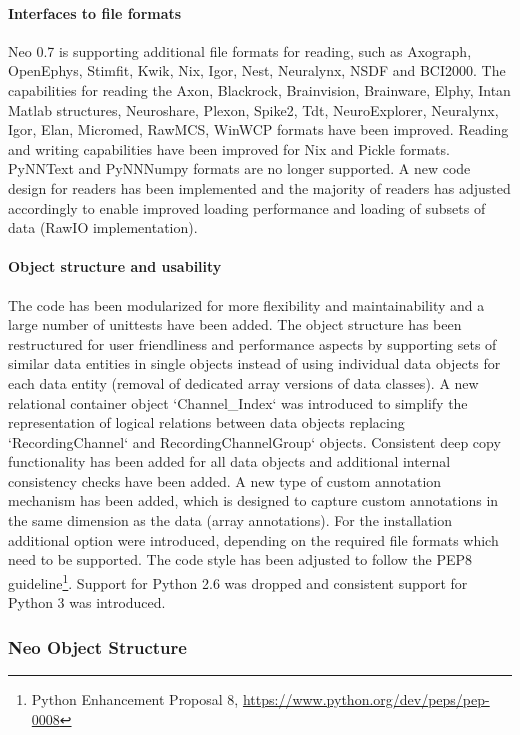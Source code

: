 \paragraph{Interfaces to file formats}
Neo 0.7 is supporting additional file formats for reading, such as Axograph, OpenEphys, Stimfit, Kwik, Nix, Igor, Nest, Neuralynx, NSDF and BCI2000. The capabilities for reading the Axon, Blackrock, Brainvision, Brainware, Elphy, Intan Matlab structures, Neuroshare, Plexon, Spike2, Tdt, NeuroExplorer, Neuralynx, Igor, Elan, Micromed, RawMCS, WinWCP formats have been improved. Reading and writing capabilities have been improved for Nix and Pickle formats. PyNNText and PyNNNumpy formats are no longer supported. A new code design for readers has been implemented and the majority of readers has adjusted accordingly to enable improved loading performance and loading of subsets of data (RawIO implementation). 
\paragraph{Object structure and usability}
The code has been modularized for more flexibility and maintainability and a large number of unittests have been added. The object structure has been restructured for user friendliness and performance aspects by supporting sets of similar data entities in single objects instead of using individual data objects for each data entity (removal of dedicated array versions of data classes). A new relational container object `Channel\_Index` was introduced to simplify the representation of logical relations between data objects replacing `RecordingChannel` and RecordingChannelGroup` objects. Consistent deep copy functionality has been added for all data objects and additional internal consistency checks have been added. A new type of custom annotation mechanism has been added, which is designed to capture custom annotations in the same dimension as the data (array annotations). For the installation additional option were introduced, depending on the required file formats which need to be supported. The code style has been adjusted to follow the PEP8 guideline\footnote{Python Enhancement Proposal 8, \url{https://www.python.org/dev/peps/pep-0008}}. Support for Python 2.6 was dropped and consistent support for Python 3 was introduced.



\subsubsection{Neo Object Structure}


